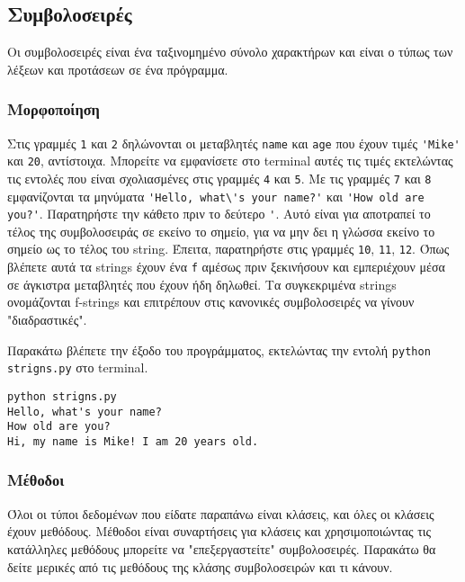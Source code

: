 \documentclass[14pt]{extreport}
\begin{document}
\newpage

\subsection{Συμβολοσειρές}

Οι συμβολοσειρές είναι ένα ταξινομημένο σύνολο χαρακτήρων και είναι ο τύπως των λέξεων και προτάσεων σε ένα πρόγραμμα.

\subsubsection{Μορφοποίηση}



Στις γραμμές \lstinline{1} και \lstinline{2} δηλώνονται οι μεταβλητές \lstinline{name} και \lstinline{age} που έχουν τιμές \lstinline{'Mike'} και \lstinline{20}, αντίστοιχα. Μπορείτε να εμφανίσετε στο terminal αυτές τις τιμές εκτελώντας τις εντολές που είναι σχολιασμένες στις γραμμές \lstinline{4} και \lstinline{5}. Με τις γραμμές \lstinline{7} και \lstinline{8} εμφανίζονται τα μηνύματα \lstinline{'Hello, what\'s your name?'} και \lstinline{'How old are you?'}. Παρατηρήστε την κάθετο πριν το δεύτερο \lstinline{'}. Αυτό είναι για αποτραπεί το τέλος της συμβολοσειράς σε εκείνο το σημείο, για να μην δει η γλώσσα εκείνο το σημείο ως το τέλος του string. Έπειτα, παρατηρήστε στις γραμμές \lstinline{10}, \lstinline{11}, \lstinline{12}. Όπως βλέπετε αυτά τα strings έχουν ένα \lstinline{f} αμέσως πριν ξεκινήσουν και εμπεριέχουν μέσα σε άγκιστρα μεταβλητές που έχουν ήδη δηλωθεί. Τα συγκεκριμένα strings ονομάζονται f-strings και επιτρέπουν στις κανονικές συμβολοσειρές να γίνουν "διαδραστικές".

Παρακάτω βλέπετε την έξοδο του προγράμματος, εκτελώντας την εντολή \lstinline{python strigns.py} στο terminal.

\begin{lstlisting}[language={}]
python strigns.py
Hello, what's your name?
How old are you?
Hi, my name is Mike! I am 20 years old.
\end{lstlisting}

\subsubsection{Μέθοδοι}

Όλοι οι τύποι δεδομένων που είδατε παραπάνω είναι κλάσεις, και όλες οι κλάσεις έχουν μεθόδους. Μέθοδοι είναι συναρτήσεις για κλάσεις και χρησιμοποιώντας τις κατάλληλες μεθόδους μπορείτε να "επεξεργαστείτε" συμβολοσειρές. Παρακάτω θα δείτε μερικές από τις μεθόδους της κλάσης συμβολοσειρών και τι κάνουν.
\end{document}
